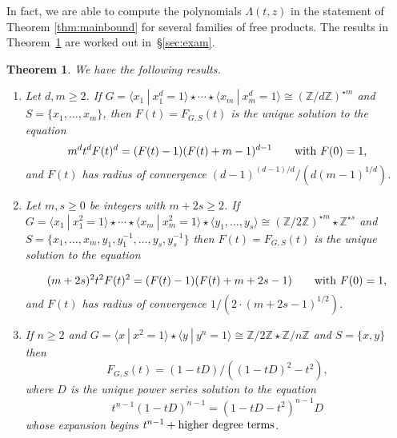 \documentclass[11pt]{amsart}
\newtheorem{theorem}{Theorem}[section]
\theoremstyle{definition}
\newcommand{\mjm}[1]{{\color{red}\sl \textbf{\underline{M:}} #1}}
\begin{document}
In fact, we are able to compute the polynomials $\Lambda(t,z)$ in the statement of Theorem \ref{thm:mainbound} for several families of free products.
The results in Theorem~\ref{thm:main2} are worked out
in~\S\ref{sec:exam}.
\begin{theorem} 
\label{thm:main2}
We have the following results.
\begin{enumerate}[itemsep=15pt,label=(\alph*)]
\item Let $d,m \ge 2$. If $G=\langle x_1 ~|~x_1^d=1\rangle\star \cdots \star \langle x_m~|~x_m^d=1\rangle \cong \left(\mathbb{Z}/d\mathbb{Z}\right)^{\star m}$ and $S=\{x_1,\ldots ,x_m\}$, then $F(t)=F_{G,S}(t)$ is the unique solution to the equation
$$m^d t^d F(t)^d = (F(t)-1)(F(t)+m-1)^{d-1}\qquad {\rm with}~F(0)=1,$$ and $F(t)$ has radius of convergence  $(d-1)^{(d-1)/d}/(d(m-1)^{1/d})$.\label{example:a}

\item Let $m, s\ge 0$ be integers with $m+2s\ge 2$. If $G=\langle x_1 ~|~x_1^2=1\rangle\star \cdots \star \langle x_m~|~x_m^2=1\rangle \star \langle y_1,\ldots, y_s \rangle \cong \left(\mathbb{Z}/2\mathbb{Z}\right)^{\star m} \star \mathbb{Z}^{\star s}$ and  $S=\{x_1,\ldots ,x_m,y_1,y_1^{-1},\ldots ,y_s, y_s^{-1}\}$ then $F(t)=F_{G,S}(t)$ is the unique solution to the equation

$$(m+2s)^2 t^2 F(t)^2 = (F(t)-1)(F(t)+m+2s-1)\qquad {\rm with}~F(0)=1,$$ and $F(t)$ has radius of convergence  $1/(2\cdot (m+2s-1)^{1/2})$.
\label{example:b}

\item If $n\ge 2$ and $G=\langle x~|~x^2=1\rangle \star \langle y ~|~y^n=1\rangle \cong \mathbb{Z}/2\mathbb{Z}\star \mathbb{Z}/n\mathbb{Z}$ and $S=\{x,y\}$ then 
$$F_{G,S}(t)= (1-tD)/((1-tD)^2-t^2),$$ where $D$ is the unique power series solution to the equation
$$t^{n-1}(1-tD)^{n-1} = (1-tD-t^2)^{n-1} D$$ whose expansion begins $t^{n-1}+{\rm higher~degree~terms}$.
\label{example:d}

\end{enumerate}
\end{theorem}
\end{document}
